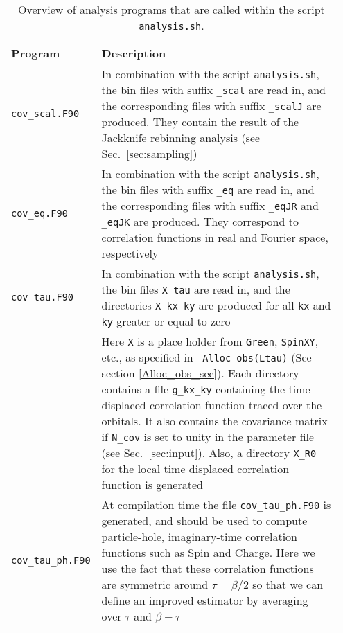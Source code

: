 \begin{table}[h]
	\begin{center}
	\begin{tabular}{@{} p{0.15\linewidth} p{0.8\linewidth} @{}}\toprule
		Program & Description \\\midrule
		\texttt{cov\_scal.F90}  &  In combination with the script \texttt{analysis.sh}, the bin files with suffix \texttt{\_scal} are read in, and  the corresponding files with suffix \texttt{\_scalJ} are produced. They  contain the  result of the Jackknife rebinning analysis  (see Sec.~\ref{sec:sampling})  \\
		\texttt{cov\_eq.F90}    &  In combination with the script \texttt{analysis.sh}, the bin files with suffix \texttt{\_eq} are read in, and the corresponding files with suffix  \texttt{\_eqJR}  and  \texttt{\_eqJK}  are produced. They  correspond to correlation functions in real and Fourier space, respectively  \\
		\texttt{cov\_tau.F90}   &  In combination with the script \texttt{analysis.sh}, the bin files  \texttt{X\_tau} are read in, and the directories  \texttt{X\_kx\_ky} are produced  for all \texttt{kx} and \texttt{ky} greater or equal to zero \\
		& Here \texttt{X}  is a place holder from \texttt{Green}, \texttt{SpinXY}, etc., as specified in \texttt{ Alloc\_obs(Ltau)} (See section \ref{Alloc_obs_sec}). Each directory contains  a  file    \texttt{g\_kx\_ky}  containing the  time-displaced correlation function traced over the  orbitals.  It also contains the covariance matrix if \texttt{N\_cov} is set to unity in the parameter file  (see Sec.~\ref{sec:input}). Also, a directory  \texttt{X\_R0}  for the local  time displaced  correlation function is generated  \\                         
		\texttt{cov\_tau\_ph.F90} & At compilation time  the file \texttt{cov\_tau\_ph.F90} is generated, and  should be used to compute particle-hole, imaginary-time correlation functions such as Spin and Charge. Here we use the fact that these  correlation functions  are symmetric around $\tau = \beta/2$ so that we can define an improved estimator by averaging over $\tau$ and $\beta - \tau$  
		\\\bottomrule
	\end{tabular}
	\caption{ Overview of analysis programs that are called within the script \texttt{analysis.sh}. \label{table:analysis_programs}}
\end{center}
\end{table}
